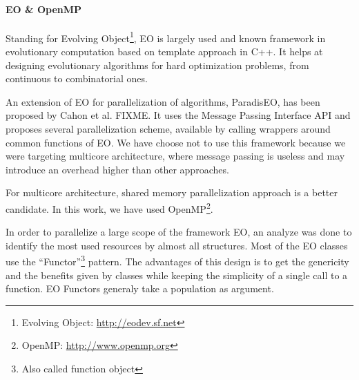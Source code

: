 \documentclass{sig-alternate}
\newcommand{\DAEYAHSP}{{\sc DaE$_{\text{YAHSP}}$}}
\begin{document}
\paragraph{EO \& OpenMP} %


Standing for Evolving Object\footnote{Evolving Object:
\url{http://eodev.sf.net}}, EO is largely used and known framework in
evolutionary computation based on template approach in C++. It helps at
designing evolutionary algorithms for hard optimization problems, from
continuous to combinatorial ones.

An extension of EO for parallelization of algorithms, ParadisEO, has been
proposed by Cahon et al. FIXME. It uses the Message Passing Interface API and
proposes several parallelization scheme, available by calling wrappers around
common functions of EO. We have choose not to use this framework because we
were targeting multicore architecture, where message passing is useless and may
introduce an overhead higher than other approaches. 


For multicore architecture, shared memory parallelization approach is a better
candidate. In this work, we have used OpenMP\footnote{OpenMP: \url{http://www.openmp.org}}.


In order to parallelize a large scope of the framework EO, an analyze was done
to identify the most used resources by almost all structures. Most of the EO
classes use the ``Functor''\footnote{Also called function object} pattern. The
advantages of this design is to get the genericity and the benefits given by
classes while keeping the simplicity of a single call to a function. EO Functors
generaly take a population as argument.
\end{document}

